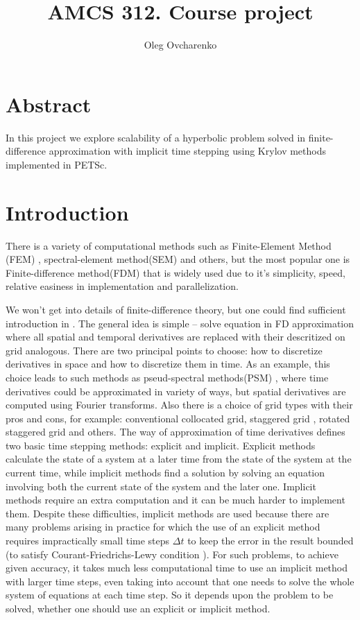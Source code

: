 \documentclass[12pt,a4paper]{report}
\title{AMCS 312. Course project}
\author{Oleg Ovcharenko}
\begin{document}
\maketitle

\section*{Abstract}
In this project we explore scalability of a hyperbolic problem solved in finite-difference approximation with implicit time stepping using Krylov methods implemented in PETSc.

\section*{Introduction}

There is a variety of computational methods such as Finite-Element Method (FEM) \citep{strang1973analysis}, spectral-element method(SEM) \citep{komatitsch1999introduction} and others, but the most popular one is Finite-difference method(FDM) that is widely used due to it's simplicity, speed, relative easiness in implementation and parallelization.

We won't get into details of finite-difference theory, but one could find sufficient introduction in \cite{moczo2007finite}. The general idea is simple -- solve equation in FD approximation where all spatial and temporal derivatives are replaced with their descritized on grid analogous. There are two principal points to choose: how to discretize derivatives in space and how to discretize them in time. As an example, this choice leads to such methods as pseud-spectral methods(PSM) \citep{kosloff1982forward}, where time derivatives could be approximated in variety of ways, but spatial derivatives are computed using Fourier transforms. Also there is a choice of grid types with their pros and cons, for example: conventional collocated grid, staggered grid \cite{Virieux1984, Virieux1986}, rotated staggered grid \citep{saenger2000modeling} and others. The way of approximation of time derivatives defines two basic time stepping methods: explicit and implicit. Explicit methods calculate the state of a system at a later time from the state of the system at the current time, while implicit methods find a solution by solving an equation involving both the current state of the system and the later one. Implicit methods require an extra computation and it can be much harder to implement them. Despite these difficulties, implicit methods are used because there are many problems arising in practice for which the use of an explicit method requires impractically small time steps $\Delta t$ to keep the error in the result bounded (to satisfy Courant-Friedrichs-Lewy condition \citep{courant1928partiellen}). For such problems, to achieve given accuracy, it takes much less computational time to use an implicit method with larger time steps, even taking into account that one needs to solve the whole system of equations at each time step. So it depends upon the problem to be solved, whether one should use an explicit or implicit method.\\
\end{document}
